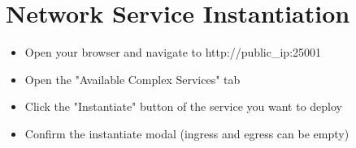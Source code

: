 	\newpage
	
	\section{Network Service Instantiation}
	\label{sec:Network Service Instantiation}
	\begin{itemize}
		\item Open your browser and navigate to http://public\_ip:25001
		\item Open the "Available Complex Services" tab
		\item Click the "Instantiate" button of the service you want to deploy
		\item Confirm the instantiate modal (ingress and egress can be empty)
		
	\end{itemize}
	



